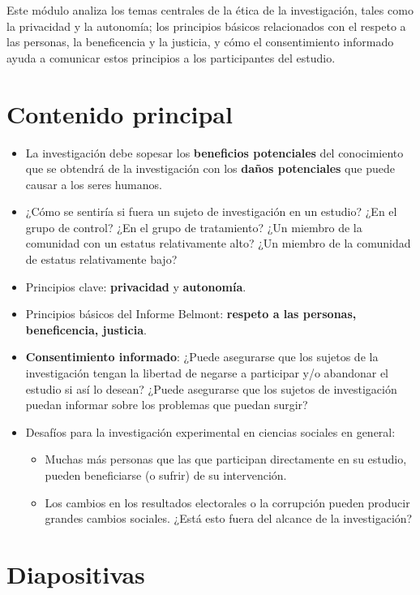 \documentclass[
  12pt,
  spanish,
]{book}
\begin{document}
Este módulo analiza los temas centrales de la ética de la investigación, tales como la privacidad y la autonomía; los principios básicos relacionados con el respeto a las personas, la beneficencia y la justicia, y cómo el consentimiento informado ayuda a comunicar estos principios a los participantes del estudio.

\hypertarget{contenido-principal-8}{%
\section{Contenido principal}\label{contenido-principal-8}}

\begin{itemize}
\item
  La investigación debe sopesar los \textbf{beneficios potenciales} del conocimiento que se obtendrá de la investigación con los \textbf{daños potenciales} que puede causar a los seres humanos.
\item
  ¿Cómo se sentiría si fuera un sujeto de investigación en un estudio? ¿En el grupo de control? ¿En el grupo de tratamiento? ¿Un miembro de la comunidad con un estatus relativamente alto? ¿Un miembro de la comunidad de estatus relativamente bajo?
\item
  Principios clave: \textbf{privacidad} y \textbf{autonomía}.
\item
  Principios básicos del Informe Belmont: \textbf{respeto a las personas, beneficencia, justicia}.
\item
  \textbf{Consentimiento informado}: ¿Puede asegurarse que los sujetos de la investigación tengan la libertad de negarse a participar y/o abandonar el estudio si así lo desean? ¿Puede asegurarse que los sujetos de investigación puedan informar sobre los problemas que puedan surgir?
\item
  Desafíos para la investigación experimental en ciencias sociales en general:

  \begin{itemize}
  \item
    Muchas más personas que las que participan directamente en su estudio, pueden beneficiarse (o sufrir) de su intervención.
  \item
    Los cambios en los resultados electorales o la corrupción pueden producir grandes cambios sociales. ¿Está esto fuera del alcance de la investigación?
  \end{itemize}
\end{itemize}

\hypertarget{diapositivas-8}{%
\section{Diapositivas}\label{diapositivas-8}}
\end{document}
